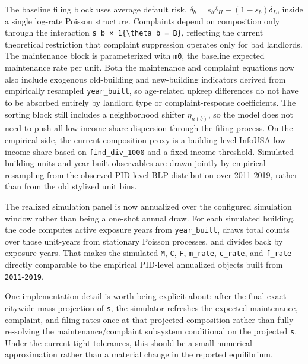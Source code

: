 \documentclass[
  11pt,
]{article}
\begin{document}
The baseline filing block uses average default risk,
\(\bar\delta_b = s_b\delta_H + (1-s_b)\delta_L\), inside a single
log-rate Poisson structure. Complaints depend on composition only
through the interaction
\texttt{s\_b\ ×\ 1\{\textbackslash{}theta\_b\ =\ B\}}, reflecting the
current theoretical restriction that complaint suppression operates only
for bad landlords. The maintenance block is parameterized with
\texttt{m0}, the baseline expected maintenance rate per unit. Both the
maintenance and complaint equations now also include exogenous
old-building and new-building indicators derived from empirically
resampled \texttt{year\_built}, so age-related upkeep differences do not
have to be absorbed entirely by landlord type or complaint-response
coefficients. The sorting block still includes a neighborhood shifter
\(\eta_{n(b)}\), so the model does not need to push all low-income-share
dispersion through the filing process. On the empirical side, the
current composition proxy is a building-level InfoUSA low-income share
based on \texttt{find\_div\_1000} and a fixed income threshold.
Simulated building units and year-built observables are drawn jointly by
empirical resampling from the observed PID-level BLP distribution over
2011-2019, rather than from the old stylized unit bins.

The realized simulation panel is now annualized over the configured
simulation window rather than being a one-shot annual draw. For each
simulated building, the code computes active exposure years from
\texttt{year\_built}, draws total counts over those unit-years from
stationary Poisson processes, and divides back by exposure years. That
makes the simulated \texttt{M}, \texttt{C}, \texttt{F},
\texttt{m\_rate}, \texttt{c\_rate}, and \texttt{f\_rate} directly
comparable to the empirical PID-level annualized objects built from
\texttt{2011}-\texttt{2019}.

One implementation detail is worth being explicit about: after the final
exact citywide-mass projection of \texttt{s}, the simulator refreshes
the expected maintenance, complaint, and filing rates once at that
projected composition rather than fully re-solving the
maintenance/complaint subsystem conditional on the projected \texttt{s}.
Under the current tight tolerances, this should be a small numerical
approximation rather than a material change in the reported equilibrium.
\end{document}
